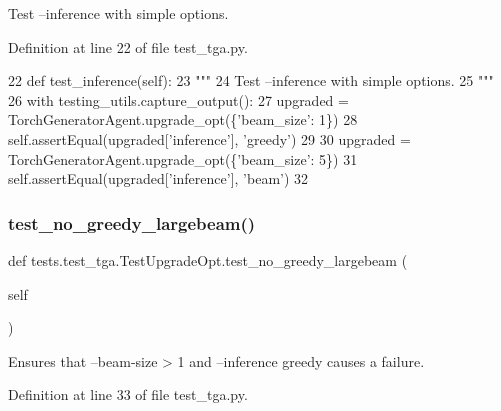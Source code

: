 \begin{DoxyVerb}Test --inference with simple options.
\end{DoxyVerb}
 

Definition at line 22 of file test\+\_\+tga.\+py.


\begin{DoxyCode}
22     \textcolor{keyword}{def }test\_inference(self):
23         \textcolor{stringliteral}{"""}
24 \textcolor{stringliteral}{        Test --inference with simple options.}
25 \textcolor{stringliteral}{        """}
26         with testing\_utils.capture\_output():
27             upgraded = TorchGeneratorAgent.upgrade\_opt(\{\textcolor{stringliteral}{'beam\_size'}: 1\})
28             self.assertEqual(upgraded[\textcolor{stringliteral}{'inference'}], \textcolor{stringliteral}{'greedy'})
29 
30             upgraded = TorchGeneratorAgent.upgrade\_opt(\{\textcolor{stringliteral}{'beam\_size'}: 5\})
31             self.assertEqual(upgraded[\textcolor{stringliteral}{'inference'}], \textcolor{stringliteral}{'beam'})
32 
\end{DoxyCode}
\mbox{\label{classtests_1_1test__tga_1_1TestUpgradeOpt_a811fa4e0fa3155e3a031968cbc69b369}} 
\subsubsection{\texorpdfstring{test\+\_\+no\+\_\+greedy\+\_\+largebeam()}{test\_no\_greedy\_largebeam()}}
{\footnotesize\ttfamily def tests.\+test\+\_\+tga.\+Test\+Upgrade\+Opt.\+test\+\_\+no\+\_\+greedy\+\_\+largebeam (\begin{DoxyParamCaption}\item[{}]{self }\end{DoxyParamCaption})}

\begin{DoxyVerb}Ensures that --beam-size > 1 and --inference greedy causes a failure.
\end{DoxyVerb}
 

Definition at line 33 of file test\+\_\+tga.\+py.


